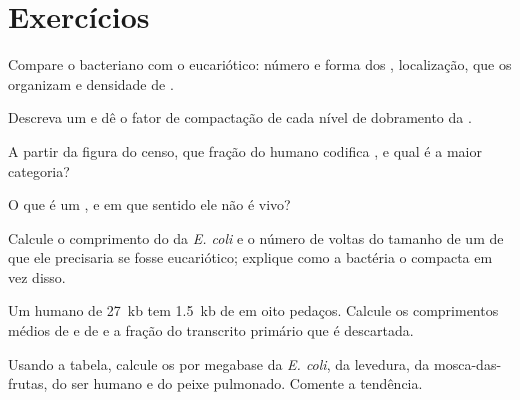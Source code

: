 \section{Exercícios}

\begin{exercise}[$\star$]\label{exo:b1:genomes:1}
Compare o  bacteriano com o eucariótico: número e forma dos
, localização,  que os organizam e densidade de
.
\end{exercise}

\begin{exercise}[$\star$]\label{exo:b1:genomes:2}
Descreva um  e dê o fator de compactação de cada nível de
dobramento da .
\end{exercise}

\begin{exercise}[$\star$]\label{exo:b1:genomes:3}
A partir da figura do censo, que fração do  humano codifica
, e qual é a maior categoria?
\end{exercise}

\begin{exercise}[$\star$]\label{exo:b1:genomes:4}
O que é um , e em que sentido ele não é vivo?
\end{exercise}

\begin{exercise}[$\star\star$]\label{exo:b1:genomes:5}
Calcule o comprimento do  da \emph{E. coli} e o número de
voltas do tamanho de um  de que ele precisaria se fosse
eucariótico; explique como a bactéria o compacta em vez disso.
\end{exercise}

\begin{exercise}[$\star\star$]\label{exo:b1:genomes:6}
Um  humano de \qty{27}{kb} tem \qty{1.5}{kb} de  em oito
pedaços. Calcule os comprimentos médios de  e de  e a fração
do transcrito primário que é descartada.
\end{exercise}

\begin{exercise}[$\star\star$]\label{exo:b1:genomes:7}
Usando a tabela, calcule os  por megabase da \emph{E. coli}, da
levedura, da mosca-das-frutas, do ser humano e do peixe pulmonado.
Comente a tendência.
\end{exercise}

